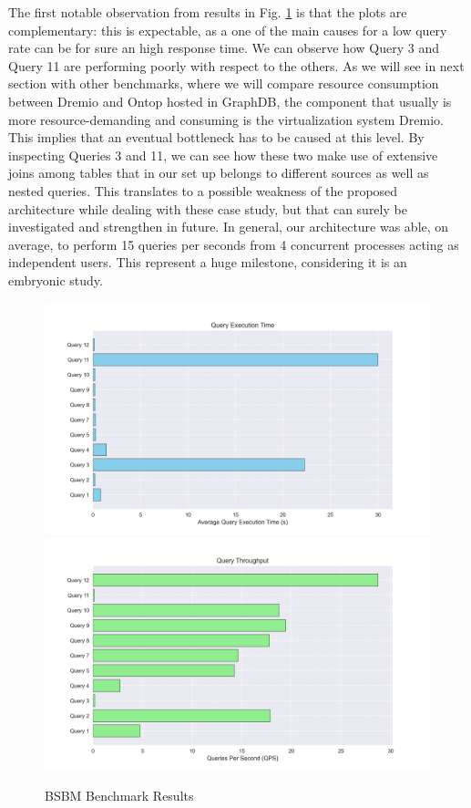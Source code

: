 The first notable observation from results in Fig. \ref{fig:bsbmbenchmarkresults} is that the plots are complementary: this is expectable, as a one of the main causes for a low query rate can be for sure an high response time.
We can observe how Query 3 and Query 11 are performing poorly with respect to the others. As we will see in next section with other benchmarks, where we will compare resource consumption between Dremio and Ontop hosted in GraphDB, the component that usually is more resource-demanding and consuming is the virtualization system Dremio. This implies that an eventual bottleneck has to be caused at this level. By inspecting Queries 3 and 11, we can see how these two make use of extensive joins among tables that in our set up belongs to different sources as well as nested queries. This translates to a possible weakness of the proposed architecture while dealing with these case study, but that can surely be investigated and strengthen in future.
In general, our architecture was able, on average, to perform 15 queries per seconds from 4 concurrent processes acting as independent users. This represent a huge milestone, considering it is an embryonic study.
\\
\begin{figure}[!ht]
    \includegraphics[width=16cm]{res/query_execution_time.png}
    \\
    \includegraphics[width=16cm]{res/query_throughput.png}
    \caption{BSBM Benchmark Results}
    \label{fig:bsbmbenchmarkresults}
\end{figure}
\\

